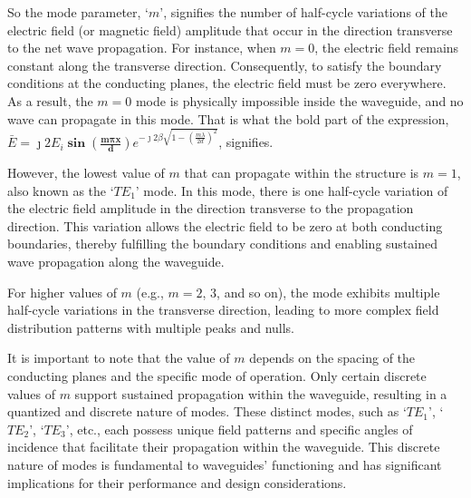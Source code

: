 So the mode parameter, `$m$', signifies the number of half-cycle variations of the electric field (or magnetic field) amplitude that occur in the direction transverse to the net wave propagation. For instance, when $m=0$, the electric field remains constant along the transverse direction. Consequently, to satisfy the boundary conditions at the conducting planes, the electric field must be zero everywhere. As a result, the $m=0$ mode is physically impossible inside the waveguide, and no wave can propagate in this mode. That is what the bold part of the expression, $\bar{E} = \jmath 2E_i\boldsymbol{\sin(\frac{m\pi x}{d})}e^{-\jmath 2\beta\sqrt{1 - \left(\frac{m\lambda}{2d}\right)^2}}$, signifies.

However, the lowest value of $m$ that can propagate within the structure is $m=1$, also known as the `$TE_{1}$' mode. In this mode, there is one half-cycle variation of the electric field amplitude in the direction transverse to the propagation direction. This variation allows the electric field to be zero at both conducting boundaries, thereby fulfilling the boundary conditions and enabling sustained wave propagation along the waveguide.

For higher values of $m$ (e.g., $m=2$, $3$, and so on), the mode exhibits multiple half-cycle variations in the transverse direction, leading to more complex field distribution patterns with multiple peaks and nulls.

It is important to note that the value of $m$ depends on the spacing of the conducting planes and the specific mode of operation. Only certain discrete values of $m$ support sustained propagation within the waveguide, resulting in a quantized and discrete nature of modes. These distinct modes, such as `$TE_{1}$', `$TE_{2}$', `$TE_{3}$', etc., each possess unique field patterns and specific angles of incidence that facilitate their propagation within the waveguide. This discrete nature of modes is fundamental to waveguides' functioning and has significant implications for their performance and design considerations.

